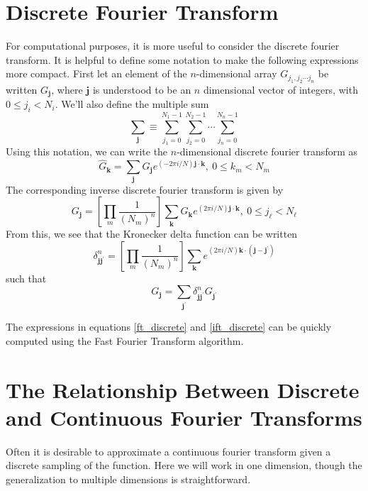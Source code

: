 \documentclass[12pt,preprint]{aastex}			%
\begin{document}
\section{Discrete Fourier Transform}
For computational purposes, it is more useful to consider the discrete
fourier transform. It is helpful to define some notation to make the 
following expressions
more compact.  First let an element of the $n$-dimensional array
$G_{j_1,j_2\cdots j_n}$ be written $G_\mathbf{j}$, where $\mathbf j$ is
understood to be an $n$ dimensional vector of integers, with 
$0 \le j_i < N_i$.  We'll also define the multiple sum
\begin{equation}
  \sum_{\mathbf{j}} \equiv
  \sum_{j_1=0}^{N_1-1}\sum_{j_2=0}^{N_2-1}\cdots\sum_{j_n=0}^{N_n-1}
\end{equation}
Using this notation, we can write the $n$-dimensional discrete fourier
transform as
\begin{equation}
  \label{ft_discrete}
  \hat{G}_{\mathbf{k}} 
  = \sum_{\mathbf{j}}
  G_{\mathbf{j}} e^{(-2\pi i/N)\mathbf{j}\cdot\mathbf{k}},\ 0\le k_m< N_m
\end{equation}
The corresponding inverse discrete fourier transform is given by
\begin{equation}
  \label{ift_discrete}
  G_{\mathbf{j}}
  = \left[\prod_m\frac{1}{\left(N_m\right)^n}\right]
  \sum_{\mathbf{k}}
  \hat{G}_{\mathbf{k}} e^{(2\pi i/N)\mathbf{j}\cdot\mathbf{k}},\ 0\le j_\ell< N_\ell
\end{equation}
From this, we see that the Kronecker delta function can be written
\begin{equation}
  \delta^n_{\mathbf{j}\mathbf{j^\prime}} 
  = \left[\prod_m\frac{1}{\left(N_m\right)^n}\right]
  \sum_{\mathbf{k}}
  e^{(2\pi i/N)\mathbf{k}\cdot(\mathbf{j}-\mathbf{j^\prime})}
\end{equation}
such that
\begin{equation}
  G_{\mathbf{j}} 
  = \sum_{\mathbf{j^\prime}}
  \delta^n_{\mathbf{j}\mathbf{j^\prime}}
  G_{\mathbf{j^\prime}} 
\end{equation}

The expressions in equations \ref{ft_discrete} and \ref{ift_discrete} can
be quickly computed using the Fast Fourier Transform algorithm.

\section{The Relationship Between Discrete and Continuous Fourier Transforms}
Often it is desirable to approximate a continuous fourier transform given 
a discrete sampling of the function.  Here we will work in one dimension,
though the generalization to multiple dimensions is straightforward.
\end{document}
